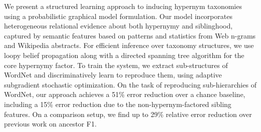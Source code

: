 We present a structured learning approach to inducing hypernym taxonomies using a probabilistic graphical model formulation. Our model incorporates heterogeneous relational evidence about both hypernymy and siblinghood, captured by semantic features based on patterns and statistics from Web n-grams and Wikipedia abstracts. For efficient inference over taxonomy structures, we use loopy belief propagation along with a directed spanning tree algorithm for the core hypernymy factor. To train the system, we extract sub-structures of WordNet and discriminatively learn to reproduce them, using adaptive subgradient stochastic optimization. On the task of reproducing sub-hierarchies of WordNet, our approach achieves a 51\% error reduction over a chance baseline, including a 15\% error reduction due to the non-hypernym-factored sibling features. On a comparison setup, we find up to 29\% relative error reduction over previous work on ancestor F1.

